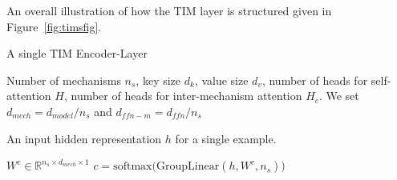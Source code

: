 \documentclass{article}
\begin{document}
An overall illustration of how the TIM layer is structured given in Figure~\ref{fig:timsfig}. %

\begin{algorithm}[h]
   \caption{A single TIM Encoder-Layer}
   \label{sec:algodetail}
   \begin{algorithmic}%
   \footnotesize
    Number of mechanisms $n_s$, key size $d_k$, value size $d_v$, number of heads for self-attention $H$, number of heads for inter-mechanism attention $H_c$.  We set $d_{mech} = d_{model}/n_s$ and $d_{ffn-m} = d_{ffn}/n_s$ 
   \item[]
     An input hidden representation $h$ for a single example. 
   
  
  
  
  
   \item[]
    \STATE \quad $W^c \in \mathbb{R}^{n_s \times d_\mathit{mech} \times 1}$
    \STATE \quad $c = \mathrm{softmax}\big(\mathrm{GroupLinear}(h, W^c, n_s)\big)$


\end{algorithmic}
\end{algorithm}
\end{document}
